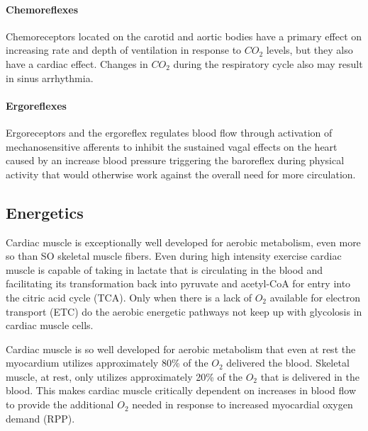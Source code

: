 \paragraph{Chemoreflexes}
Chemoreceptors located on the carotid and aortic bodies have a primary effect on increasing rate and depth of ventilation in response to $CO_2$ levels, but they also have a cardiac effect. Changes in $CO_2$ during the respiratory cycle also may result in sinus arrhythmia.

\paragraph{Ergoreflexes}
Ergoreceptors and the ergoreflex regulates blood flow through activation of mechanosensitive afferents to inhibit the sustained vagal effects on the heart caused by an increase blood pressure triggering the baroreflex during physical activity that would otherwise work against the overall need for more circulation.

\subsection{Energetics}

Cardiac muscle is exceptionally well developed for aerobic metabolism, even more so than SO skeletal muscle fibers. Even during high intensity exercise cardiac muscle is capable of taking in lactate that is circulating in the blood and facilitating its transformation back into pyruvate and acetyl-CoA for entry into the citric acid cycle (TCA). Only when there is a lack of $O_2$ available for electron transport (ETC) do the aerobic energetic pathways not keep up with glycolosis in cardiac muscle cells. 

Cardiac muscle is so well developed for aerobic metabolism that even at rest the myocardium utilizes approximately 80\% of the $O_2$ delivered the blood. Skeletal muscle, at rest, only utilizes approximately 20\% of the $O_2$ that is delivered in the blood. This makes cardiac muscle critically dependent on increases in blood flow to provide the additional $O_2$ needed in response to increased myocardial oxygen demand (RPP).

